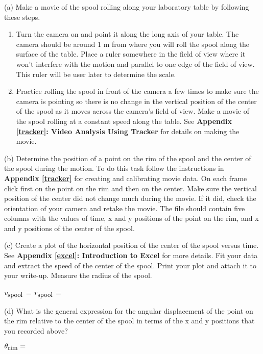 (a) Make a movie of the spool rolling along your laboratory table by following
these steps. 

\begin{enumerate}
\item Turn the camera on and point it along the long axis of your table. The camera
should be around 1 m from where you will roll the spool along the surface of
the table. Place a ruler somewhere in the field of view where it won't interfere
with the motion and parallel to one edge of the field of view. This ruler will
be user later to determine the scale. 
\item Practice rolling the spool in front of the camera a few times to make sure the
camera is pointing so there is no change in the vertical position of the center
of the spool as it moves across the camera's field of view. Make a movie of
the spool rolling at a constant speed along the table. See \textbf{Appendix
\ref{tracker}: Video Analysis Using Tracker} for details on making the movie.
\end{enumerate}
(b) Determine the position of a point on the rim of the spool and the center
of the spool during the motion. To do this task follow the instructions in \textbf{Appendix
\ref{tracker}} for creating and calibrating movie data. On each frame click
first on the point on the rim and then on the center. Make sure the vertical
position of the center did not change much during the movie. If it did, check
the orientation of your camera and retake the movie. The file should contain
five columns with the values of time, x and y positions of the point on the
rim, and x and y positions of the center of the spool.

(c) Create a plot of the horizontal position of the center of the spool versus
time. See \textbf{Appendix \ref{excel}: Introduction to Excel} for more details.
Fit your data and extract the speed of the center of the spool. Print your plot
and attach it to your write-up. Measure the radius of the spool.
\vspace{5mm}

\( v_{\mbox{\small spool}} \) = \hfill{}\( r_{\mbox{\small spool}} \) = \hfill{}
\vspace{5mm}

(d) What is the general expression for the angular displacement of the point
on the rim relative to the center of the spool in terms of the x and y positions
that you recorded above? 
\vspace{5mm}

\( \theta _{\mbox{\small rim}}= \) 
\vspace{5mm}

